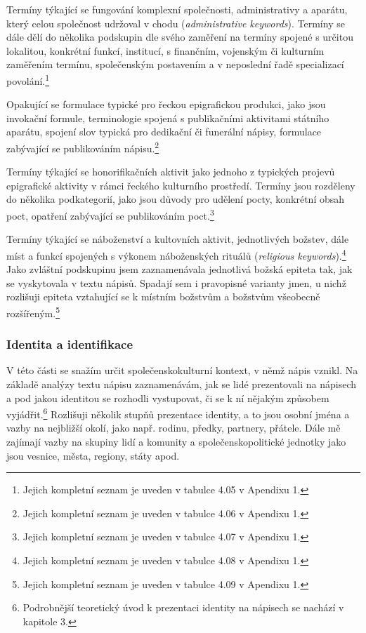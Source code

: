 \startitemize[n][stopper=.]
\item
  \startblockquote
  Termíny týkající se fungování komplexní společnosti, administrativy a aparátu, který celou společnost udržoval v chodu ({\em administrative keywords}). Termíny se dále dělí do několika podskupin dle svého zaměření na termíny spojené s určitou lokalitou, konkrétní funkcí, institucí, s finančním, vojenským či kulturním zaměřením termínu, společenským postavením a v neposlední řadě specializací povolání.\footnote{Jejich kompletní seznam je uveden v tabulce 4.05 v Apendixu 1.}
  \stopblockquote
\item
  \startblockquote
  Opakující se formulace typické pro řeckou epigrafickou produkci, jako jsou invokační formule, terminologie spojená s publikačními aktivitami státního aparátu, spojení slov typická pro dedikační či funerální nápisy, formulace zabývající se publikováním nápisu.\footnote{Jejich kompletní seznam je uveden v tabulce 4.06 v Apendixu 1.}
  \stopblockquote
\item
  \startblockquote
  Termíny týkající se honorifikačních aktivit jako jednoho z typických projevů epigrafické aktivity v rámci řeckého kulturního prostředí. Termíny jsou rozděleny do několika podkategorií, jako jsou důvody pro udělení pocty, konkrétní obsah poct, opatření zabývající se publikováním poct.\footnote{Jejich kompletní seznam je uveden v tabulce 4.07 v Apendixu 1.}
  \stopblockquote
\item
  \startblockquote
  Termíny týkající se náboženství a kultovních aktivit, jednotlivých božstev, dále míst a funkcí spojených s výkonem náboženských rituálů ({\em religious keywords}).\footnote{Jejich kompletní seznam je uveden v tabulce 4.08 v Apendixu 1.} Jako zvláštní podskupinu jsem zaznamenávala jednotlivá božská epiteta tak, jak se vyskytovala v textu nápisů. Spadají sem i pravopisné varianty jmen, u nichž rozlišuji epiteta vztahující se k místním božstvům a božstvům všeobecně rozšířeným.\footnote{Jejich kompletní seznam je uveden v tabulce 4.09 v Apendixu 1.}
  \stopblockquote
\stopitemize

\subsubsection[identita-a-identifikace]{Identita a identifikace}

V této části se snažím určit společenskokulturní kontext, v němž nápis vznikl. Na základě analýzy textu nápisu zaznamenávám, jak se lidé prezentovali na nápisech a pod jakou identitou se rozhodli vystupovat, či se k ní nějakým způsobem vyjádřit.\footnote{Podrobnější teoretický úvod k prezentaci identity na nápisech se nachází v kapitole 3.} Rozlišuji několik stupňů prezentace identity, a to jsou osobní jména a vazby na nejbližší okolí, jako např. rodinu, předky, partnery, přátele. Dále mě zajímají vazby na skupiny lidí a komunity a společenskopolitické jednotky jako jsou vesnice, města, regiony, státy apod.

